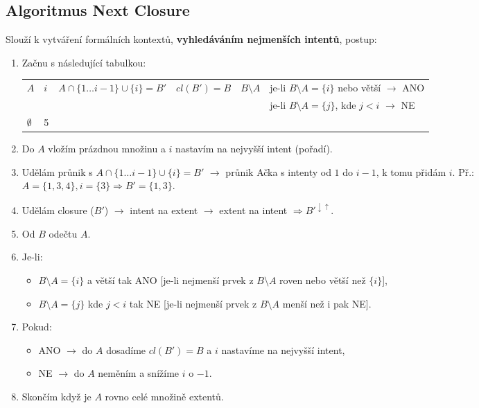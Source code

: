 \subsection{Algoritmus Next Closure}
Slouží k vytváření formálních kontextů, \textbf{vyhledáváním nejmenších intentů}, postup:
\begin{enumerate}
    \item Začnu s následující tabulkou:
          \begin{table}[H]
              \centering
              \begin{tabular}{l|l|l|l|l|p{6cm}}
                  \multirow{2}{*}{$ A $} & \multirow{2}{*}{$ i $} & \multirow{2}{*}{$ A \cap \{1 \ldots i - 1\} \cup \{i\} = B' $ } & \multirow{2}{*}{$ cl(B') = B $ } & \multirow{2}{*}{$B \setminus A $  } & je-li $B \setminus A = \{i\}$ nebo větší $\rightarrow$ ANO  \\
                                         &                        &                                                                 &                                  &                                     & je-li $B \setminus A = \{j\}$, kde $j < i$ $\rightarrow$ NE \\\hhline
                  $\emptyset$            & 5                      &                                                                 &                                  &                                     &
              \end{tabular}
          \end{table}
    \item Do $A$ vložím prázdnou množinu a $i$ nastavím na nejvyšší intent (pořadí).
    \item Udělám průnik s $A \cap \{1 \ldots i - 1\} \cup \{i\} = B'$ $\rightarrow$ průnik Ačka s intenty od $ 1 $ do $ i-1 $, k tomu přidám $i$. Př.: $A = \{1, 3, 4\}, i = \{3\} \Rightarrow B' = \{1, 3\}$.
    \item Udělám closure ($B'$) $\rightarrow$ intent na extent $\rightarrow$ extent na intent $\Rightarrow B'^{\downarrow \uparrow}$.
    \item Od $B$ odečtu $A$.
    \item Je-li:
          \begin{itemize}
              \item $B \setminus A = \{i\}$ a větší tak ANO [je-li nejmenší prvek z $B \setminus A$ roven nebo větší než $\{i\}$],
              \item $B \setminus A = \{j\}$ kde $j < i$ tak NE [je-li nejmenší prvek z $B \setminus A$ menší než i pak NE].
          \end{itemize}
    \item Pokud:
          \begin{itemize}
              \item ANO $\rightarrow$ do $A$ dosadíme $cl(B') = B$ a $i$ nastavíme na nejvyšší intent,
              \item NE $\rightarrow$ do $A$ neměním a snížíme $i$ o $-1$.
          \end{itemize}
    \item Skončím když je $A$ rovno celé množině extentů.
\end{enumerate}

